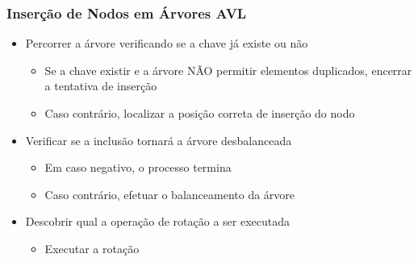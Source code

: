 \documentclass[aspectratio=169]{beamer}
\begin{document}
\begin{frame}\frametitle{Inserção de Nodos em Árvores AVL}
\begin{itemize}
	\item Percorrer a árvore verificando se a chave já existe ou não
	\begin{itemize}
		\item Se a chave existir e a árvore NÃO permitir elementos duplicados, encerrar a tentativa de inserção
		\item Caso contrário, localizar a posição correta de inserção do nodo
	\end{itemize}
	\item Verificar se a inclusão tornará a árvore desbalanceada
	\begin{itemize}
		\item Em caso negativo, o processo termina
		\item Caso contrário, efetuar o balanceamento da árvore
	\end{itemize}
	\item Descobrir qual a operação de rotação a ser executada
	\begin{itemize}
		\item Executar a rotação
	\end{itemize}
\end{itemize}
\end{frame}
\end{document}
